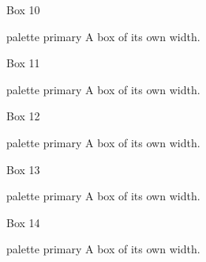 \documentclass{beamer}
\begin{document}
\begin{frame}{Box 10}
\begin{beamercolorbox}[rounded=true,shadow=true,wd=5.25cm]{palette primary}
A box of its own width.
\end{beamercolorbox}
\end{frame}
\begin{frame}{Box 11}
\begin{beamercolorbox}[rounded=true,shadow=true,wd=5.5cm]{palette primary}
A box of its own width.
\end{beamercolorbox}
\end{frame}
\begin{frame}{Box 12}
\begin{beamercolorbox}[rounded=true,shadow=true,wd=5.75cm]{palette primary}
A box of its own width.
\end{beamercolorbox}
\end{frame}
\begin{frame}{Box 13}
\begin{beamercolorbox}[rounded=true,shadow=true,wd=6.0cm]{palette primary}
A box of its own width.
\end{beamercolorbox}
\end{frame}
\begin{frame}{Box 14}
\begin{beamercolorbox}[rounded=true,shadow=true,wd=6.25cm]{palette primary}
A box of its own width.
\end{beamercolorbox}
\end{frame}
\end{document}
